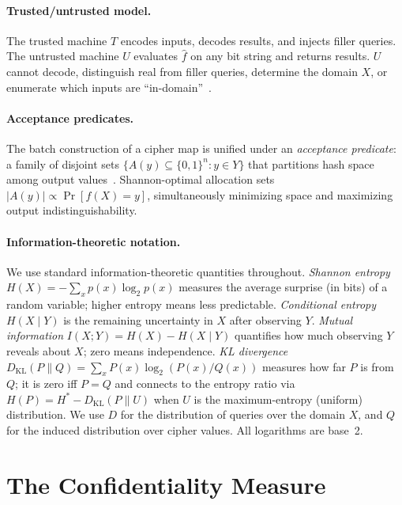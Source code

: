 \documentclass[conference]{IEEEtran}
\theoremstyle{definition}
\theoremstyle{plain}
\theoremstyle{remark}
\newcommand{\fhat}{\hat{f}}
\newcommand{\B}{\{0,1\}}
\begin{document}
\paragraph{Trusted/untrusted model.}
The trusted machine $T$ encodes inputs, decodes results, and injects
filler queries.  The untrusted machine $U$ evaluates $\fhat$ on any bit
string and returns results.  $U$ cannot decode, distinguish real from
filler queries, determine the domain $X$, or enumerate which inputs are
``in-domain''~\cite[Sec.~5]{towell2026cipher}.

\paragraph{Acceptance predicates.}
The batch construction of a cipher map is unified under an
\emph{acceptance predicate}: a family of disjoint sets
$\{A(y) \subseteq \B^n : y \in Y\}$ that partitions hash space among
output values~\cite[Sec.~6.2]{towell2026cipher}.  Shannon-optimal
allocation sets $|A(y)| \propto \Pr[f(X) = y]$, simultaneously
minimizing space and maximizing output indistinguishability.

\paragraph{Information-theoretic notation.}
We use standard information-theoretic quantities throughout.
\emph{Shannon entropy} $H(X) = -\sum_x p(x) \log_2 p(x)$ measures the
average surprise (in bits) of a random variable; higher entropy means
less predictable.
\emph{Conditional entropy} $H(X \mid Y)$ is the remaining uncertainty in
$X$ after observing $Y$.
\emph{Mutual information} $I(X; Y) = H(X) - H(X \mid Y)$ quantifies how
much observing $Y$ reveals about $X$; zero means independence.
\emph{KL divergence} $D_{\mathrm{KL}}(P \| Q) = \sum_x P(x) \log_2
(P(x)/Q(x))$ measures how far $P$ is from $Q$; it is zero iff $P = Q$
and connects to the entropy ratio via $H(P) = H^* - D_{\mathrm{KL}}(P
\| U)$ when $U$ is the maximum-entropy (uniform) distribution.
We use $D$ for the distribution of queries over the domain $X$, and $Q$
for the induced distribution over cipher values.
All logarithms are base~2.


\section{The Confidentiality Measure}
\label{sec:measure}
\end{document}
